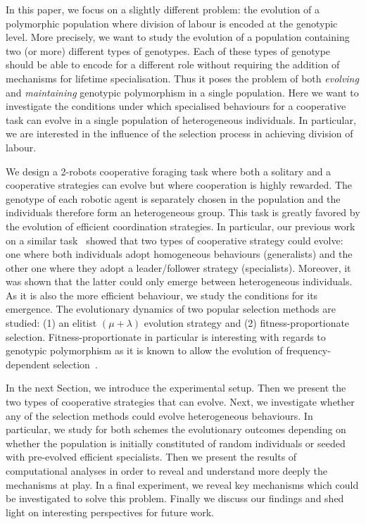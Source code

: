  In this paper, we focus on a slightly different problem: the evolution of a polymorphic population where division of labour is encoded at the genotypic level. More precisely, we want to study the evolution of a population containing two (or more) different types of genotypes. Each of these types of genotype should be able to encode for a different role without requiring the addition of mechanisms for lifetime specialisation. Thus it poses the problem of both \emph{evolving} and \emph{maintaining} genotypic polymorphism in a single population. Here we want to investigate the conditions under which specialised behaviours for a cooperative task can evolve in a single population of heterogeneous individuals. In particular, we are interested in the influence of the selection process in achieving division of labour. 

  We design a 2-robots cooperative foraging task where both a solitary and a cooperative strategies can evolve but where cooperation is highly rewarded. The genotype of each robotic agent is separately chosen in the population and the individuals therefore form an heterogeneous group. This task is greatly favored by the evolution of efficient coordination strategies. In particular, our previous work on a similar task~\parencite{Bernard2015} showed that two types of cooperative strategy could evolve: one where both individuals adopt homogeneous behaviours (generalists) and the other one where they adopt a leader/follower strategy (specialists). Moreover, it was shown that the latter could only emerge between heterogeneous individuals. As it is also the more efficient behaviour, we study the conditions for its emergence. The evolutionary dynamics of two popular selection methods are studied: (1) an elitist \((\mu + \lambda)\) evolution strategy and (2) fitness-proportionate selection. Fitness-proportionate in particular is interesting with regards to genotypic polymorphism as it is known to allow the evolution of frequency-dependent selection~\parencite{Altenberg1991}.

  In the next Section, we introduce the experimental setup. Then we present the two types of cooperative strategies that can evolve. Next, we investigate whether any of the selection methods could evolve heterogeneous behaviours. In particular, we study for both schemes the evolutionary outcomes depending on whether the population is initially constituted of random individuals or seeded with pre-evolved efficient specialists. Then we present the results of computational analyses in order to reveal and understand more deeply the mechanisms at play. In a final experiment, we reveal key mechanisms which could be investigated to solve this problem. Finally we discuss our findings and shed light on interesting perspectives for future work.




